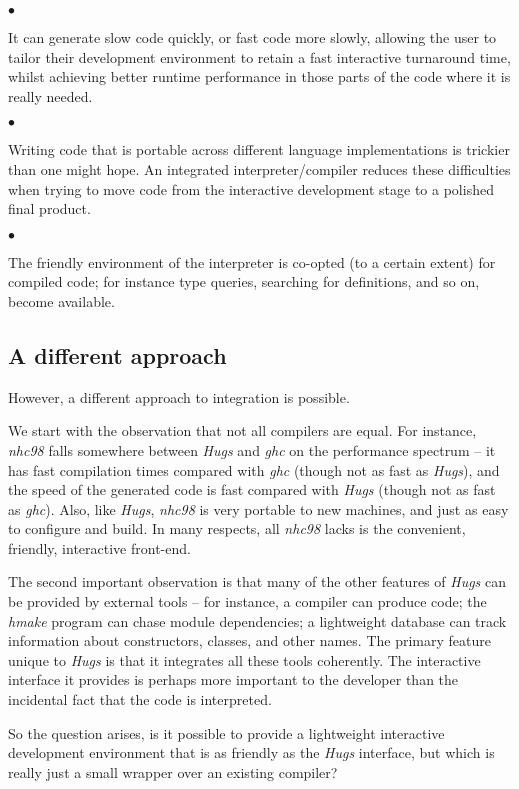 \documentclass[a4paper]{article}
\begin{document}
$\bullet$
  \parbox[t]{155mm}{
    It can generate slow code quickly, or fast code more slowly,
      allowing the user to tailor their development environment
      to retain a fast interactive turnaround time, whilst achieving
      better runtime performance in those parts of the code where it
      is really needed.}

$\bullet$
  \parbox[t]{155mm}{
    Writing code that is portable across different language implementations
      is trickier than one might hope.  An integrated interpreter/compiler
      reduces these difficulties when trying to move code from the
      interactive development stage to a polished final product.}

$\bullet$
  \parbox[t]{155mm}{
    The friendly environment of the interpreter is co-opted (to a
      certain extent) for compiled code; for instance type queries,
      searching for definitions, and so on, become available.}


\subsection{A different approach}
\noindent
However, a different approach to integration is possible.

We start with the observation that not all compilers are equal.
For instance, {\em nhc98} falls somewhere between {\em Hugs} and
{\em ghc} on the performance spectrum -- it has fast compilation times
compared with {\em ghc} (though not as fast as {\em Hugs}), and the
speed of the generated code is fast compared with {\em Hugs} (though
not as fast as {\em ghc}).  Also, like {\em Hugs}, {\em nhc98} is very
portable to new machines, and just as easy to configure and build.
In many respects, all {\em nhc98} lacks is the convenient, friendly,
interactive front-end.

The second important observation is that many of the other features
of {\em Hugs} can be provided by external tools -- for instance,
a compiler can produce code; the {\em hmake} program can chase
module dependencies; a lightweight database can track information
about constructors, classes, and other names.  The primary feature
unique to {\em Hugs} is that it integrates all these tools coherently.
The interactive interface it provides is perhaps more important to
the developer than the incidental fact that the code is interpreted.

So the question arises, is it possible to provide a lightweight
interactive development environment that is as friendly as the {\em
Hugs} interface, but which is really just a small wrapper over an
existing compiler?
\end{document}
